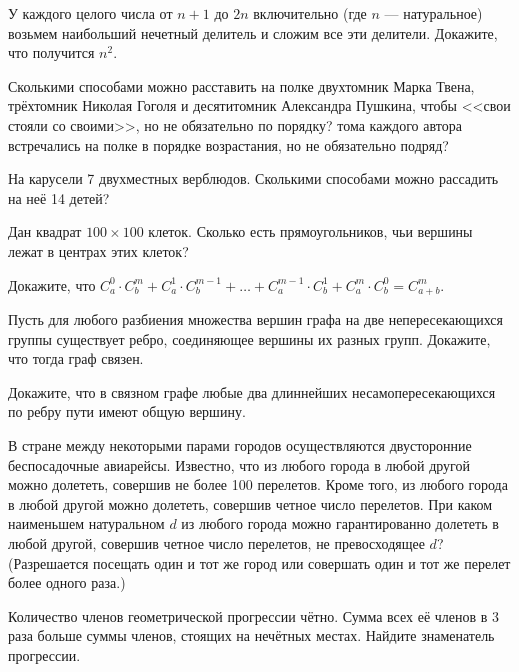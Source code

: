\documentclass[a4paper,12pt]{article}
\begin{document}

\smallskip

У каждого целого числа от $n+1$ до $2n$ включительно
(где $n$ --- натуральное) возьмем наибольший нечетный
делитель и сложим все эти делители. Докажите, что получится $n^2$.

 Сколькими способами можно расставить на полке двухтомник Марка Твена,
трёхтомник Николая Гоголя и десятитомник Александра Пушкина, чтобы
 <<свои стояли со своими>>, но не обязательно по порядку?
 тома каждого автора встречались на полке в порядке возрастания, но не обязательно подряд?



На карусели 7 двухместных верблюдов. Сколькими способами можно рассадить на неё 14 детей?

Дан квадрат $100\times100$ клеток. Сколько есть прямоугольников, чьи вершины лежат в центрах этих клеток?


Докажите, что
$C_a^0\cdot C_b^m+C_a^1\cdot C_b^{m-1}+\ldots+C_a^{m-1}\cdot C_b^1
+C_a^m\cdot C_b^0=C_{a+b}^m$.

Пусть для любого разбиения множества вершин графа на две
непересекающихся группы существует ребро, соединяющее вершины их
разных групп. Докажите, что тогда граф связен.


Докажите, что в связном графе любые два длиннейших несамопересекающихся по
ребру пути имеют общую вершину.


В стране между некоторыми парами городов осуществляются двусторонние беспосадочные авиарейсы. Известно, что из
любого города в любой другой можно долететь, совершив не более 100 перелетов. Кроме того, из любого города в любой другой можно долететь, совершив четное число перелетов. При каком
наименьшем натуральном $d$ из любого города можно гарантированно долететь в любой другой, совершив четное число перелетов,
не превосходящее $d$?
(Разрешается посещать один и тот же город или совершать
один и тот же перелет более одного раза.)

 Количество членов геометрической прогрессии чётно.
Сумма всех её членов в 3 раза больше суммы членов, стоящих
на нечётных местах. Найдите знаменатель прогрессии.
\end{document}
